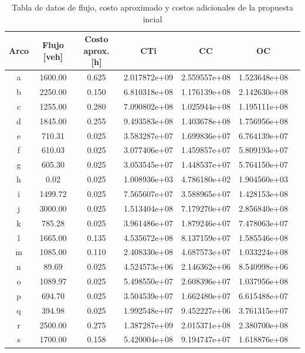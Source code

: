\documentclass[letterpaper,12pt]{article}
\begin{document}
\begin{table}[h!]
    \centering
    \begin{tabular}{ccccccc}
        \toprule
        \textbf{Arco} & \textbf{Flujo [veh]} & \textbf{Costo aprox. [h]} & \textbf{CTi} & \textbf{CC} & \textbf{OC} \\
        \midrule
        a & 1600.00 & 0.625 & 2.017872e+09 & 2.559557e+08 & 1.523648e+08 \\
        b & 2250.00 & 0.150 & 6.810318e+08 & 1.176139e+08 & 2.142630e+08 \\
        c & 1255.00 & 0.280 & 7.090802e+08 & 1.025944e+08 & 1.195111e+08 \\
        d & 1845.00 & 0.255 & 9.493583e+08 & 1.403678e+08 & 1.756956e+08 \\
        e & 710.31  & 0.025 & 3.583287e+07 & 1.699836e+07 & 6.764139e+07 \\
        f & 610.03  & 0.025 & 3.077406e+07 & 1.459857e+07 & 5.809193e+07 \\
        g & 605.30  & 0.025 & 3.053545e+07 & 1.448537e+07 & 5.764150e+07 \\
        h & 0.02    & 0.025 & 1.008936e+03 & 4.786180e+02 & 1.904560e+03 \\
        i & 1499.72 & 0.025 & 7.565607e+07 & 3.588965e+07 & 1.428153e+08 \\
        j & 3000.00 & 0.025 & 1.513404e+08 & 7.179270e+07 & 2.856840e+08 \\
        k & 785.28  & 0.025 & 3.961486e+07 & 1.879246e+07 & 7.478063e+07 \\
        l & 1665.00 & 0.135 & 4.535672e+08 & 8.137159e+07 & 1.585546e+08 \\
        m & 1085.00 & 0.110 & 2.408330e+08 & 4.687573e+07 & 1.033224e+08 \\
        n & 89.69   & 0.025 & 4.524573e+06 & 2.146362e+06 & 8.540998e+06 \\
        o & 1089.97 & 0.025 & 5.498550e+07 & 2.608396e+07 & 1.037956e+08 \\
        p & 694.70  & 0.025 & 3.504539e+07 & 1.662480e+07 & 6.615488e+07 \\
        q & 394.98  & 0.025 & 1.992548e+07 & 9.452227e+06 & 3.761315e+07 \\
        r & 2500.00 & 0.275 & 1.387287e+09 & 2.015371e+08 & 2.380700e+08 \\
        s & 1700.00 & 0.158 & 5.420004e+08 & 9.194747e+07 & 1.618876e+08 \\
        \bottomrule
    \end{tabular}
    \caption{Tabla de datos de flujo, costo aproximado y costos adicionales de la propuesta incial}
    \label{tab:datos_actualizados}
\end{table}
\end{document}
